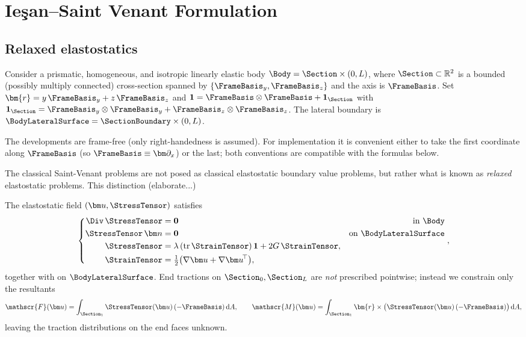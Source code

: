 \section{Ie\c{s}an--Saint Venant Formulation}

\subsection{Relaxed elastostatics}

Consider a prismatic, homogeneous, and isotropic linearly elastic body 
\(
\Body=\Section\times(0,L)
\),
where \(\Section\subset\mathbb{R}^2\) is a bounded (possibly multiply connected) cross-section
spanned by \(\{\FrameBasis_y,\FrameBasis_z\}\) and the axis is \(\FrameBasis\).
Set \(\bm{r}=y\,\FrameBasis_y+z\,\FrameBasis_z\) and
\(
\mathbf{1}=\FrameBasis\otimes\FrameBasis+\mathbf{1}_\Section
\)
with
\(
\mathbf{1}_\Section=\FrameBasis_y\otimes\FrameBasis_y+\FrameBasis_z\otimes\FrameBasis_z
\).
The lateral boundary is \(\BodyLateralSurface=\SectionBoundary\times(0,L)\).

\begin{remark}
The developments are frame-free (only right-handedness is assumed). For implementation it is convenient
either to take the first coordinate along \(\FrameBasis\) (so \(\FrameBasis\equiv\bm\partial_x\)) or the last;
both conventions are compatible with the formulas below.
\end{remark}

The classical Saint-Venant problems are not posed as classical elastostatic boundary value problems, but rather what is known as \emph{relaxed} elastostatic problems. This distinction (elaborate...)

The elastostatic field \((\bm u,\StressTensor)\) satisfies
\begin{equation}
\left\{
\begin{aligned}
\Div\,\StressTensor&=\mathbf{0} &\qquad\text{in }\Body\\
\StressTensor\,\bm n&=\mathbf{0} & \text{on }\BodyLateralSurface\\
\StressTensor&=\lambda\,(\operatorname{tr}\StrainTensor)\,\mathbf{1}+2G\,\StrainTensor,\\
\StrainTensor&=\tfrac12\big(\nabla\bm u+\nabla\bm u^{\!\top}\big),
\end{aligned}\right.,
\label{eq:partial-elastostatic-equilibrium}
\end{equation}
together with on \(\BodyLateralSurface\).
End tractions on \(\Section_0,\Section_L\) are \emph{not} prescribed pointwise; instead we constrain only the resultants
\begin{equation}
\mathscr{F}(\bm u)=\int_{\Section_1}\StressTensor(\bm u)\,(-\FrameBasis)\,\mathrm{d}A,\qquad
\mathscr{M}(\bm u)=\int_{\Section_1}\bm{r}\times\big(\StressTensor(\bm u)\,(-\FrameBasis)\big)\,\mathrm{d}A,
\label{eq:def-resultants}
\end{equation}
leaving the traction distributions on the end faces unknown.


